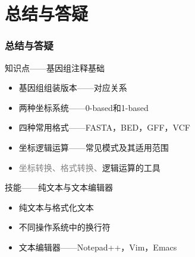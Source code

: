 \section{总结与答疑}
\begin{frame}
  \frametitle{总结与答疑}
  \begin{block}{知识点——基因组注释基础}
    \begin{itemize}
      \item 基因组组装版本——对应关系
      \item 两种坐标系统——0-based和1-based
      \item 四种常用格式——FASTA，BED，GFF，VCF
      \item 坐标逻辑运算——常见模式及其适用范围
      \item \textcolor{gray}{坐标转换、格式转换、}逻辑运算的工具
    \end{itemize}
  \end{block}
  \begin{block}{技能——纯文本与文本编辑器}
    \begin{itemize}
      \item 纯文本与格式化文本
      \item 不同操作系统中的换行符
      \item 文本编辑器——Notepad++，Vim，Emacs
    \end{itemize}
  \end{block}
\end{frame}
